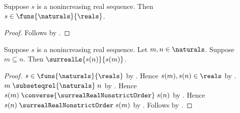\begin{proposition}\label{nonincreasing_real_sequence_type}
    Suppose $s$ is a nonincreasing real sequence.
    Then $s\in\funs{\naturals}{\reals}$.
\end{proposition}
\begin{proof}
    Follows by
        .
\end{proof}

\begin{proposition}\label{nonincreasing_real_sequence_mono}
    Suppose $s$ is a nonincreasing real sequence.
    Let $m,n\in\naturals$.
    Suppose $m\subseteq n$.
    Then $\surrealLe{s(n)}{s(m)}$.
\end{proposition}
\begin{proof}
    $s\in\funs{\naturals}{\reals}$ by
        .
    Hence $s(m),s(n)\in\reals$ by .
    $m\mathrel{\subseteqrel{\naturals}}n$ by .
    Hence $s(m)\mathrel{\converse{\surrealRealNonstrictOrder}}s(n)$ by
        .
    Hence $s(n)\mathrel{\surrealRealNonstrictOrder}s(m)$ by
        .
    Follows by .
\end{proof}

